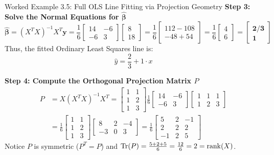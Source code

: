\begin{examplebox}{Worked Example 3.5: Full OLS Line Fitting via Projection Geometry}
\textbf{Step 3: Solve the Normal Equations for $\hat{\boldsymbol{\beta}}$}
\begin{equation*}
\hat{\boldsymbol{\beta}} = (X^T X)^{-1} X^T \mathbf{y} = \frac{1}{6} \begin{bmatrix} 14 & -6 \\ -6 & 3 \end{bmatrix} \begin{bmatrix} 8 \\ 18 \end{bmatrix} = \frac{1}{6} \begin{bmatrix} 112 - 108 \\ -48 + 54 \end{bmatrix} = \frac{1}{6} \begin{bmatrix} 4 \\ 6 \end{bmatrix} = \mathbf{\begin{bmatrix} 2/3 \\ 1 \end{bmatrix}}
\end{equation*}
Thus, the fitted Ordinary Least Squares line is:
\begin{equation*}
\hat{y} = \frac{2}{3} + 1 \cdot x
\end{equation*}

\textbf{Step 4: Compute the Orthogonal Projection Matrix $P$}
\begin{align*}
P &= X (X^T X)^{-1} X^T = \begin{bmatrix} 1 & 1 \\ 1 & 2 \\ 1 & 3 \end{bmatrix} \frac{1}{6} \begin{bmatrix} 14 & -6 \\ -6 & 3 \end{bmatrix} \begin{bmatrix} 1 & 1 & 1 \\ 1 & 2 & 3 \end{bmatrix} \\
&= \frac{1}{6} \begin{bmatrix} 1 & 1 \\ 1 & 2 \\ 1 & 3 \end{bmatrix} \begin{bmatrix} 8 & 2 & -4 \\ -3 & 0 & 3 \end{bmatrix} = \frac{1}{6} \begin{bmatrix} 5 & 2 & -1 \\ 2 & 2 & 2 \\ -1 & 2 & 5 \end{bmatrix}
\end{align*}
Notice $P$ is symmetric ($P^T = P$) and $\operatorname{Tr}(P) = \frac{5 + 2 + 5}{6} = \frac{12}{6} = 2 = \operatorname{rank}(X)$.


\end{examplebox}

